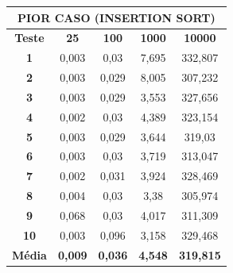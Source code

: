 \documentclass[a4paper, 12pt]{article}
\begin{document}
\begin{minipage}{1.0\textwidth}
  \begin{minipage}[c]{0.49\textwidth}
  \centering
\begin{tabular}{ccccc}

                       \multicolumn{ 5}{c}{{\bf PIOR CASO (INSERTION SORT)}} \\
\hline
{\bf Teste} &   {\bf 25} &  {\bf 100} & {\bf 1000} & {\bf 10000} \\
\hline
   {\bf 1} &      0,003 &       0,03 &      7,695 &    332,807 \\
\hline
   {\bf 2} &      0,003 &      0,029 &      8,005 &    307,232 \\
\hline
   {\bf 3} &      0,003 &      0,029 &      3,553 &    327,656 \\
\hline
   {\bf 4} &      0,002 &       0,03 &      4,389 &    323,154 \\
\hline
   {\bf 5} &      0,003 &      0,029 &      3,644 &     319,03 \\
\hline
   {\bf 6} &      0,003 &       0,03 &      3,719 &    313,047 \\
\hline
   {\bf 7} &      0,002 &      0,031 &      3,924 &    328,469 \\
\hline
   {\bf 8} &      0,004 &       0,03 &       3,38 &    305,974 \\
\hline
   {\bf 9} &      0,068 &       0,03 &      4,017 &    311,309 \\
\hline
  {\bf 10} &      0,003 &      0,096 &      3,158 &    329,468 \\
\hline
{\bf Média} & {\bf 0,009} & {\bf 0,036} & {\bf 4,548} & {\bf 319,815} \\
\hline
\end{tabular}  


  \end{minipage}
 \hfill
 \begin{minipage}[c]{0.49\textwidth}
 \centering
{}\hfill

\end{minipage}
\end{minipage}
\end{document}
